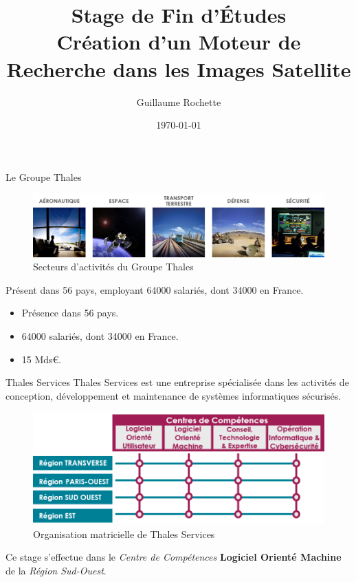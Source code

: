 \documentclass[11pt]{beamer}
\author{Guillaume Rochette}
\title{Stage de Fin d'Études
		\\
Création d'un Moteur de Recherche dans les Images Satellite}
\date{\today}
\begin{document}
\begin{frame}
\titlepage
\end{frame}

\begin{frame}{Le Groupe Thales}
	\begin{figure}[H]
		\centering
		\includegraphics[scale=0.425]{Images/Secteurs_Activites.png}
		\caption{Secteurs d'activités du Groupe Thales}
	\end{figure}
	Présent dans 56 pays, employant 64000 salariés, dont 34000 en France.
	\begin{itemize}
		\item Présence dans 56 pays.
		\item 64000 salariés, dont 34000 en France.
		\item 15 Mds€.
	\end{itemize}
\end{frame}

\begin{frame}{Thales Services}
	Thales Services est une entreprise spécialisée dans les activités de conception, développement et maintenance de systèmes informatiques sécurisés.
	\begin{figure}[H]
		\centering
		\includegraphics[scale=0.55]{Images/Matrice_Thales_Services.png}
		\caption{Organisation matricielle de Thales Services}
	\end{figure}
	Ce stage s'effectue dans le \emph{Centre de Compétences} \textbf{Logiciel Orienté Machine} de la \emph{Région Sud-Ouest}.
\end{frame}
\end{document}

